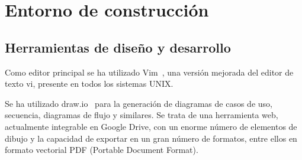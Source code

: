 \section{Entorno de construcción}

\subsection{Herramientas de diseño y desarrollo}

Como editor principal se ha utilizado Vim~\cite{vim}, una versión mejorada del editor de
texto vi, presente en todos los sistemas UNIX.

Se ha utilizado draw.io~\cite{draw.io} para la generación de diagramas de casos de uso,
secuencia, diagramas de flujo y similares. Se trata de una herramienta web, 
actualmente integrable en Google Drive, con un enorme número de elementos de
dibujo y la capacidad de exportar en un gran número de formatos, entre ellos en
formato vectorial PDF (Portable Document Format).

